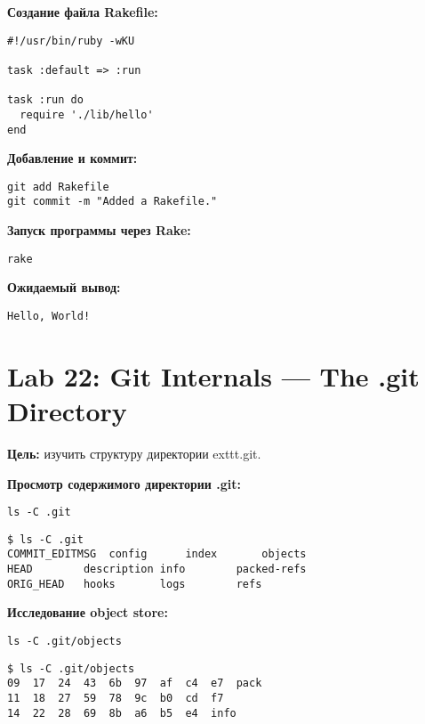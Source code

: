 \documentclass[a4paper,12pt]{report}
\begin{document}
\textbf{Создание файла Rakefile:}
\begin{verbatim}
#!/usr/bin/ruby -wKU

task :default => :run

task :run do
  require './lib/hello'
end
\end{verbatim}

\textbf{Добавление и коммит:}
\begin{verbatim}
git add Rakefile
git commit -m "Added a Rakefile."
\end{verbatim}


\textbf{Запуск программы через Rake:}
\begin{verbatim}
rake
\end{verbatim}

\textbf{Ожидаемый вывод:}
\begin{verbatim}
Hello, World!
\end{verbatim}


\section{Lab 22: Git Internals — The .git Directory}

\textbf{Цель:} изучить структуру директории 	exttt{.git}.

\textbf{Просмотр содержимого директории .git:}
\begin{verbatim}
ls -C .git
\end{verbatim}
\begin{verbatim}
$ ls -C .git
COMMIT_EDITMSG	config		index		objects
HEAD		description	info		packed-refs
ORIG_HEAD	hooks		logs		refs
\end{verbatim}


\textbf{Исследование object store:}
\begin{verbatim}
ls -C .git/objects
\end{verbatim}
\begin{verbatim}
$ ls -C .git/objects
09	17	24	43	6b	97	af	c4	e7	pack
11	18	27	59	78	9c	b0	cd	f7
14	22	28	69	8b	a6	b5	e4	info
\end{verbatim}
\end{document}
